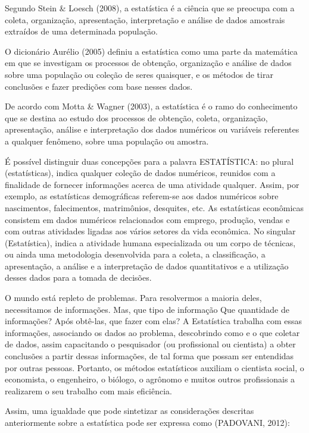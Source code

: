 Segundo Stein \& Loesch (2008), a estatística é a ciência que se
preocupa com a coleta, organização, apresentação, interpretação e
análise de dados amostrais extraídos de uma determinada
população.\vskip0.3cm

O dicionário Aurélio (2005) definiu a estatística como uma parte da matemática em que se investigam os processos de obtenção, organização e análise de dados sobre uma população ou coleção de seres quaisquer, e os métodos de tirar conclusões e fazer predições com base nesses dados.\vskip0.3cm

De acordo com Motta \& Wagner (2003), a estatística é o ramo do conhecimento que se destina ao estudo dos processos de obtenção, coleta, organização, apresentação, análise e interpretação dos dados numéricos ou variáveis referentes a qualquer fenômeno, sobre uma população ou amostra.\vskip0.3cm

É possível distinguir duas concepções para a palavra ESTATÍSTICA: no plural (estatísticas), indica qualquer coleção de dados numéricos, reunidos com a finalidade de fornecer informações acerca de uma atividade qualquer. Assim, por exemplo, as estatísticas demográficas referem-se aos dados numéricos sobre nascimentos, falecimentos, matrimônios, desquites, etc. As estatísticas econômicas consistem em dados numéricos relacionados com emprego, produção, vendas e com outras atividades ligadas aos vários setores da vida econômica. No singular (Estatística), indica a atividade humana especializada ou um corpo de técnicas, ou ainda uma metodologia desenvolvida para a coleta, a classificação, a apresentação, a análise e a interpretação de dados quantitativos e a utilização desses dados para a tomada de decisões.\vskip0.3cm

O mundo está repleto de problemas. Para resolvermos a maioria deles, necessitamos de informações. Mas, que tipo de informação Que quantidade de informações? Após obtê-las, que fazer com elas? A Estatística trabalha com essas informações, associando os dados ao problema, descobrindo como e o que coletar de dados, assim capacitando o pesquisador (ou profissional ou cientista) a obter conclusões a partir dessas informações, de tal forma que possam ser entendidas por outras pessoas. Portanto, os métodos estatísticos auxiliam o cientista social, o economista, o engenheiro, o biólogo, o agrônomo e muitos outros profissionais a realizarem o seu trabalho com mais eficiência.\vskip0.3cm

Assim, uma igualdade que pode sintetizar as considerações descritas anteriormente sobre a estatística pode ser expressa como (PADOVANI, 2012):

